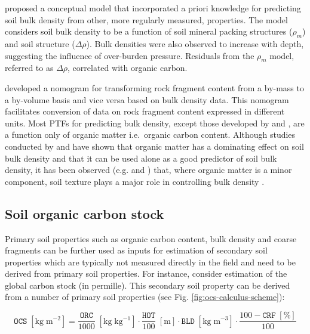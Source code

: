\documentclass[graybox,natbib,nospthms,UStrade]{svmono}
\begin{document}
\citet{Tranter2007SUM} proposed a conceptual model that incorporated a priori
knowledge for predicting soil bulk density from other, more regularly
measured, properties. The model considers soil bulk density to be a
function of soil mineral packing structures (\(\rho_m\)) and soil
structure (\(\Delta \rho\)). Bulk densities were also observed to increase with
depth, suggesting the influence of over-burden pressure. Residuals from
the \(\rho_m\) model, referred to as \(\Delta \rho\), correlated with
organic carbon.

\citet{Torri1994C} developed a nomogram for transforming rock fragment content
from a by-mass to a by-volume basis and vice versa based on bulk density
data. This nomogram facilitates conversion of data on rock fragment
content expressed in different units. Most PTFs for predicting bulk
density, except those developed by \citet{Rawls1983SS} and \citet{Bernoux1998SSSAJ},
are a function only of organic matter i.e.~organic carbon content.
Although studies conducted by \citet{Saini1966N} and \citet{Jeffrey1970JE} have shown
that organic matter has a dominating effect on soil bulk density and
that it can be used alone as a good predictor of soil bulk density, it
has been observed (e.g. \citet{Alexander1980SSSAJ} and \citet{Manrique1991SSSAJ}) that,
where organic matter is a minor component, soil texture plays a major
role in controlling bulk density .

\hypertarget{soil-organic-carbon-stock}{%
\subsection{Soil organic carbon stock}\label{soil-organic-carbon-stock}}

Primary soil properties such as organic carbon content, bulk density and
coarse fragments can be further used as inputs for estimation of secondary soil
properties which are typically not measured directly in the field and
need to be derived from primary soil properties. For instance, consider
estimation of the global carbon stock (in permille). This secondary soil
property can be derived from a number of primary soil properties
\citep{Nelson1982, sanderman2018soil} (see Fig. \ref{fig:ocs-calculus-scheme}):

\begin{equation}
    \mathtt{OCS} \; [\mathrm{kg \; m^{-2}}] = \frac{{\mathtt{ORC}}}{{1000}} \; [\mathrm{kg \; kg^{-1}}] \cdot \frac{{\mathtt{HOT}}}{{100}} \; [\mathrm{m}] \cdot \mathtt{BLD} \; [\mathrm{kg \; m^{-3}}] \cdot \frac{{100-\mathtt{CRF} \; [\mathrm{\%}]}}{{100}}
\label{eq:ocs-calc}
\end{equation}
\end{document}
